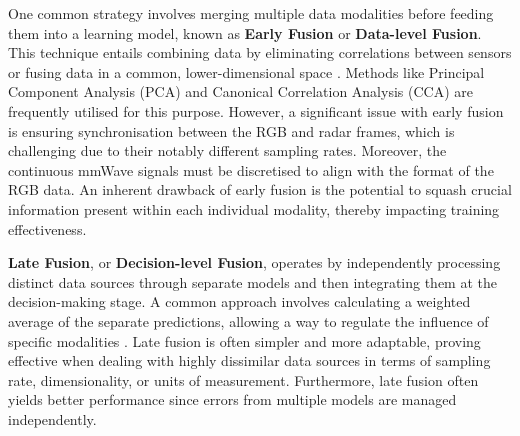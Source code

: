 \documentclass{mpaper}
\begin{document}
One common strategy involves merging multiple data modalities before feeding them into a learning model, known as \textbf{Early Fusion} or \textbf{Data-level Fusion}. This technique entails combining data by eliminating correlations between sensors or fusing data in a common, lower-dimensional space \cite{khaleghi2013multisensor}. Methods like Principal Component Analysis (PCA) and Canonical Correlation Analysis (CCA) are frequently utilised for this purpose. However, a significant issue with early fusion is ensuring synchronisation between the RGB and radar frames, which is challenging due to their notably different sampling rates. Moreover, the continuous mmWave signals must be discretised to align with the format of the RGB data. An inherent drawback of early fusion is the potential to squash crucial information present within each individual modality, thereby impacting training effectiveness.

\textbf{Late Fusion}, or \textbf{Decision-level Fusion}, operates by independently processing distinct data sources through separate models and then integrating them at the decision-making stage. A common approach involves calculating a weighted average of the separate predictions, allowing a way to regulate the influence of specific modalities \cite{pawlowski2023effective}. Late fusion is often simpler and more adaptable, proving effective when dealing with highly dissimilar data sources in terms of sampling rate, dimensionality, or units of measurement. Furthermore, late fusion often yields better performance since errors from multiple models are managed independently.
\end{document}
